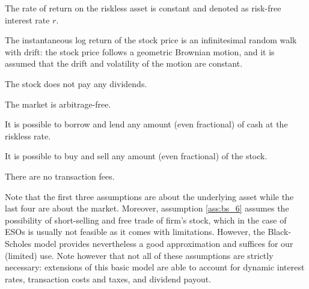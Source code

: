     \begin{assumption}
        \label{ass:bs_1}
        The rate of return on the riskless asset is constant and denoted as risk-free interest rate $r$.
    \end{assumption}
    

    \begin{assumption}
        \label{ass: bs_2}
        The instantaneous log return of the stock price is an infinitesimal random walk with drift: the stock price follows a geometric Brownian motion, and it is assumed that the drift and volatility of the motion are constant.
    \end{assumption}

    \begin{assumption}
        \label{ass:bs_3}
        The stock does not pay any dividends.
    \end{assumption}

    \begin{assumption}
        \label{ass:bs_4}
        The market is arbitrage-free.
    \end{assumption}

    \begin{assumption}
        \label{ass:bs_5}
        It is possible to borrow and lend any amount (even fractional) of cash at the riskless rate.
    \end{assumption}

    \begin{assumption}
        \label{ass:bs_6}
        It is possible to buy and sell any amount (even fractional) of the stock.
    \end{assumption}
    
    \begin{assumption}
        \label{ass:bs_7}
        There are no transaction fees.
    \end{assumption}
    
    Note that the first three assumptions are about the underlying asset while the last four are about the market. Moreover, assumption \ref*{ass:bs_6} assumes the possibility of short-selling and free trade of firm's stock, which in the case of ESOs is usually not feasible as it comes with limitations. However, the Black-Scholes model provides nevertheless a good approximation and suffices for our (limited) use. Note however that not all of these assumptions are strictly necessary: extensions of this basic model are able to account for dynamic interest rates, transaction costs and taxes, and dividend payout.  

